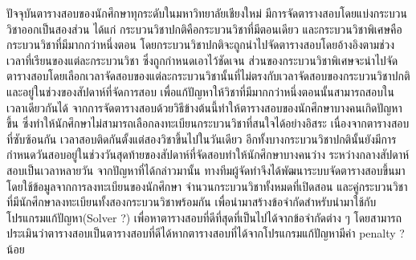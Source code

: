 \maketitle
\makesignature

\ifproject
\begin{abstractTH}
    

ปัจจุบันตารางสอบของนักศึกษาทุกระดับในมหาวิทยาลัยเชียงใหม่ มีการจัดตารางสอบโดยแบ่งกระบวนวิชาออกเป็นสองส่วน 
ได้แก่ กระบวนวิชาปกติคือกระบวนวิชาที่มีตอนเดียว และกระบวนวิชาพิเศษคือกระบวนวิชาที่มีมากกว่าหนึ่งตอน
โดยกระบวนวิชาปกติจะถูกนำไปจัดตารางสอบโดยอ้างอิงตามช่วงเวลาที่เรียนของแต่ละกระบวนวิชา ซึ่งถูกกำหนดเอาไว้ชัดเจน
ส่วนของกระบวนวิชาพิเศษจะนำไปจัดตารางสอบโดยเลือกเวลาจัดสอบของแต่ละกระบวนวิชานั้นที่ไม่ตรงกับเวลาจัดสอบของกระบวนวิชาปกติและอยู่ในช่วงของสัปดาห์ที่จัดการสอบ
เพื่อแก้ปัญหาให้วิชาที่มีมากกว่าหนึ่งตอนนั้นสามารถสอบในเวลาเดียวกันได้
จากการจัดตารางสอบด้วยวิธีข้างต้นนี้ทำให้ตารางสอบของนักศึกษาบางคนเกิดปัญหาขึ้น
ซึ่งทำให้นักศึกษาไม่สามารถเลือกลงทะเบียนกระบวนวิชาที่สนใจได้อย่างอิสระ เนื่องจากตารางสอบที่ซับซ้อนกัน
เวลาสอบติดกันตั้งแต่สองวิชาขึ้นไปในวันเดียว อีกทั้งบางกระบวนวิชาปกตินั้นยังมีการกำหนดวันสอบอยู่ในช่วงวันสุดท้ายของสัปดาห์ที่จัดสอบทำให้นักศึกษาบางคนว่าง
ระหว่างกลางสัปดาห์สอบเป็นเวลาหลายวัน จากปัญหาที่ได้กล่าวมานั้น ทางทีมผู้จัดทำจึงได้พัฒนาระบบจัดตารางสอบขึ้นมา 
โดยใช้ข้อมูลจากการลงทะเบียนของนักศึกษา จำนวนกระบวนวิชาทั้งหมดที่เปิดสอน และคู่กระบวนวิชาที่มีนักศึกษาลงทะเบียนทั้งสองกระบวนวิชาพร้อมกัน 
เพื่อนำมาสร้างข้อจำกัดสำหรับนำมาใช้กับโปรแกรมแก้ปัญหา(Solver ?) เพื่อหาตารางสอบที่ดีที่สุดที่เป็นไปได้จากข้อจำกัดต่าง ๆ 
โดยสามารถประเมินว่าตารางสอบเป็นตารางสอบที่ดีได้หากตารางสอบที่ได้จากโปรแกรมแก้ปัญหามีค่า penalty ? น้อย 


\end{abstractTH}

